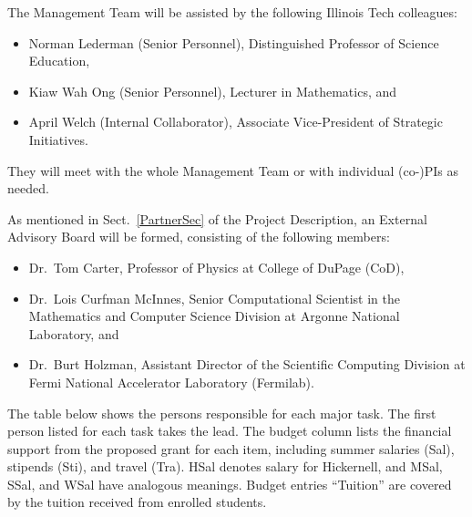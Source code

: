 \documentclass[11pt]{NSFamsart}
\begin{document}
The Management Team will be assisted by the following Illinois Tech colleagues:
\begin{itemize}
\item Norman Lederman (Senior Personnel), Distinguished Professor of Science Education,
\item Kiaw Wah Ong  (Senior Personnel), Lecturer in Mathematics, and 
\item April Welch (Internal Collaborator), Associate Vice-President of Strategic Initiatives. \end{itemize}
They will meet with the whole Management Team or with individual (co-)PIs as needed.

As mentioned in Sect.\ \ref{PartnerSec} of the Project Description, an External Advisory Board will be formed, consisting of the following members:
\begin{itemize}
\item Dr.~Tom Carter, Professor of Physics at College of DuPage (CoD),

\item Dr.~Lois Curfman McInnes, Senior Computational Scientist in the Mathematics and Computer Science Division at Argonne National Laboratory, and

\item Dr.~Burt Holzman, Assistant Director of the Scientific Computing
Division at Fermi National Accelerator Laboratory (Fermilab).

\end{itemize}

\newcommand{\Salaries}{Sal\xspace}
\newcommand{\Stipends}{Sti\xspace}
\newcommand{\Travel}{Tra\xspace}




The table below shows the persons responsible for each major task.  The first person listed for each task takes the lead.  The budget column lists the financial support from the proposed grant for each item, including summer salaries (\Salaries), stipends (\Stipends), and travel (\Travel).  HSal denotes salary for Hickernell, and M\Salaries, S\Salaries, and W\Salaries have analogous meanings.  Budget entries ``Tuition'' are covered by the tuition received from enrolled students.
\end{document}
